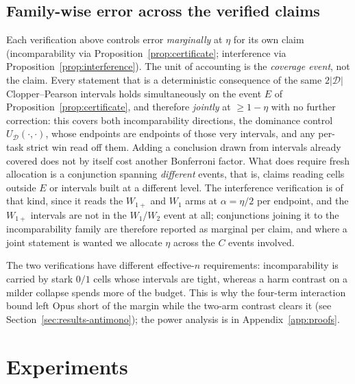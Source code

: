 \documentclass[11pt]{article}
\theoremstyle{plain}
\theoremstyle{definition}
\theoremstyle{remark}
\newcommand{\Dcal}{\mathcal{D}}
\begin{document}
\subsection{Family-wise error across the verified claims}
\label{subsec:fwer}

Each verification above controls error \emph{marginally} at $\eta$ for its own claim
(incomparability via Proposition~\ref{prop:certificate}; interference via
Proposition~\ref{prop:interference}). The unit of accounting is the \emph{coverage event}, not the
claim. Every statement that is a deterministic consequence of the same $2|\Dcal|$
Clopper--Pearson intervals holds simultaneously on the event $E$ of
Proposition~\ref{prop:certificate}, and therefore \emph{jointly} at $\ge 1-\eta$ with no further
correction: this covers both incomparability directions, the dominance control
$U_{\Dcal}(\cdot,\cdot)$, whose endpoints are endpoints of those very intervals, and any per-task
strict win read off them. Adding a conclusion drawn from intervals already covered does not by
itself cost another Bonferroni factor. What does require fresh allocation is a conjunction
spanning \emph{different} events, that is, claims reading cells outside $E$ or intervals built at a
different level. The interference verification is of that kind, since it reads the $W_{1+}$ and
$W_1$ arms at $\alpha=\eta/2$ per endpoint, and the $W_{1+}$ intervals are not in the
$W_1$/$W_2$ event at all; conjunctions joining it to the incomparability family are
therefore reported as marginal per claim, and where a joint statement is wanted we allocate $\eta$
across the $C$ events involved.

\noindent The two verifications have different effective-$n$ requirements: incomparability is
carried by stark $0/1$ cells whose intervals are tight, whereas a harm contrast on a milder
collapse spends more of the budget. This is why the four-term interaction bound left Opus short of
the margin while the two-arm contrast clears it (see Section~\ref{sec:results-antimono}); the power analysis
is in Appendix~\ref{app:proofs}.

\section{Experiments}
\label{sec:experiments}
\end{document}

